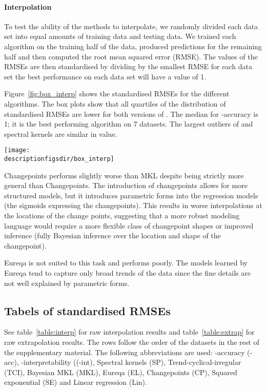 \paragraph{Interpolation}

To test the ability of the methods to interpolate, we randomly divided each data set into equal amounts of training data and testing data.
We trained each algorithm on the training half of the data, produced predictions for the remaining half and then computed the root mean squared error (RMSE).
The values of the RMSEs are then standardised by dividing by the smallest RMSE for each data set \ie the best performance on each data set will have a value of 1.

Figure~\ref{fig:box_interp} shows the standardised RMSEs for the different algorithms.
The box plots show that all quartiles of the distribution of standardised RMSEs are lower for both versions of \procedurename{}.
The median for \procedurename{}-accuracy is 1; it is the best performing algorithm on 7 datasets.
The largest outliers of \procedurename{} and spectral kernels are similar in value.

\begin{figure*}[ht]
\centering
\texttt{[image: \\descriptionfigsdir/box\_interp]}
\caption{
Box plot of standardised RMSE (best performance = 1) on 13 interpolation tasks.
}
\label{fig:box_interp}
\end{figure*}

Changepoints performs slightly worse than MKL despite being strictly more general than Changepoints.
The introduction of changepoints allows for more structured models, but it introduces parametric forms into the regression models (\ie the sigmoids expressing the changepoints).
This results in worse interpolations at the locations of the change points, suggesting that a more robust modeling language would require a more flexible class of changepoint shapes or improved inference (\eg fully Bayesian inference over the location and shape of the changepoint).

Eureqa is not suited to this task and performs poorly.
The models learned by Eureqa tend to capture only broad trends of the data since the fine details are not well explained by parametric forms.

\subsection{Tabels of standardised RMSEs}

See table~\ref{table:interp} for raw interpolation results and table~\ref{table:extrap} for raw extrapolation results. 
The rows follow the order of the datasets in the rest of the supplementary material.
The following abbreviations are used: \procedurename{}-accuracy (\procedurename{}-acc), \procedurename{}-interpretability ((\procedurename{}-int), Spectral kernels (SP), Trend-cyclical-irregular (TCI), Bayesian MKL (MKL), Eureqa (EL), Changepoints (CP), Squared exponential (SE) and Linear regression (Lin).


